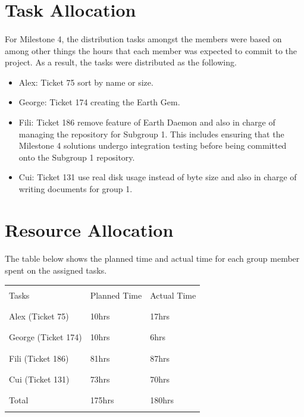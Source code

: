 \documentclass[10pt,a4,oneside]{article}
\begin{document}
\section{Task Allocation}

\paragraph{}
For Milestone 4, the distribution tasks amongst the members were based on among other 
things the hours that each member was expected to commit to the project. As a result, the tasks were distributed as the following.

\begin{itemize}
 \item Alex: Ticket 75 sort by name or size.
 \item George: Ticket 174 creating the Earth Gem.
 \item Fili: Ticket 186 remove feature of Earth Daemon and also in charge of managing the repository for Subgroup 1. This includes ensuring that the Milestone 4 solutions undergo integration testing before being committed onto the Subgroup 1 repository.
 \item Cui: Ticket 131 use real disk usage instead of byte size and also in charge of writing documents for group 1.
\end{itemize}

\newpage

\section{Resource Allocation}

\paragraph{}
The table below shows the planned time and actual time for each group member spent on the assigned tasks.

\begin{table}[ht!]
\begin{tabular}{|p{5cm}|p{1.5cm}|p{1.5cm}|} 
\hline
 & & \\
Tasks & Planned Time & Actual Time\\
 & & \\
\hline
 & & \\
Alex (Ticket 75) & 10hrs & 17hrs\\
 & & \\
\hline
 & & \\
George (Ticket 174) & 10hrs & 6hrs\\
 & & \\
\hline
 & & \\
Fili (Ticket 186) & 81hrs & 87hrs\\
 & & \\
\hline
 & & \\
Cui (Ticket 131) & 73hrs & 70hrs\\
 & & \\
\hline
 & & \\
Total & 175hrs & 180hrs\\
 & & \\
\hline
\end{tabular}
\end{table}
\end{document}
